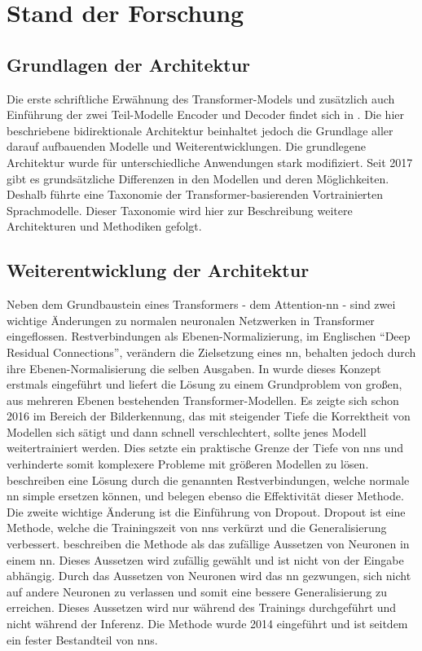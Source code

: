 \chapter{Stand der Forschung}\label{ch:relatedWork}
\section{Grundlagen der Architektur}
Die erste schriftliche Erwähnung des Transformer-Models und zusätzlich auch Einführung der zwei Teil-Modelle Encoder und Decoder findet sich in \citet{attention}.
Die hier beschriebene bidirektionale Architektur beinhaltet jedoch die Grundlage aller darauf aufbauenden Modelle und Weiterentwicklungen. 
Die grundlegene Architektur wurde für unterschiedliche Anwendungen stark modifiziert. 
Seit 2017 gibt es grundsätzliche Differenzen in den Modellen und deren Möglichkeiten. 
Deshalb führte \citet{ammus} eine Taxonomie der Transformer-basierenden Vortrainierten Sprachmodelle. 
Dieser Taxonomie wird hier zur Beschreibung weitere Architekturen und Methodiken gefolgt.\\

\section{Weiterentwicklung der Architektur}
Neben dem Grundbaustein eines Transformers - dem Attention-\ac{nn} - sind zwei wichtige Änderungen zu normalen neuronalen Netzwerken in Transformer eingeflossen. 
Restverbindungen als Ebenen-Normalizierung, im Englischen \enquote{Deep Residual Connections}, verändern die Zielsetzung eines \ac{nn}, behalten jedoch durch ihre Ebenen-Normalisierung die selben Ausgaben. 
In \citet{deep_residual} wurde dieses Konzept erstmals eingeführt und liefert die Lösung zu einem Grundproblem von großen, aus mehreren Ebenen bestehenden Transformer-Modellen. 
Es zeigte sich schon 2016 im Bereich der Bilderkennung, das mit steigender Tiefe die Korrektheit von Modellen sich sätigt und dann schnell verschlechtert, sollte jenes Modell weitertrainiert werden. 
Dies setzte ein praktische Grenze der Tiefe von \ac{nn}s und verhinderte somit komplexere Probleme mit größeren Modellen zu lösen. 
\citet{deep_residual} beschreiben eine Lösung durch die genannten Restverbindungen, welche normale \ac{nn} simple ersetzen können, und belegen ebenso die Effektivität dieser Methode.\\

Die zweite wichtige Änderung ist die Einführung von Dropout. 
Dropout ist eine Methode, welche die Trainingszeit von \ac{nn}s verkürzt und die Generalisierung verbessert. 
\citet{dropout} beschreiben die Methode als das zufällige Aussetzen von Neuronen in einem \ac{nn}. 
Dieses Aussetzen wird zufällig gewählt und ist nicht von der Eingabe abhängig. 
Durch das Aussetzen von Neuronen wird das \ac{nn} gezwungen, sich nicht auf andere Neuronen zu verlassen und somit eine bessere Generalisierung zu erreichen. 
Dieses Aussetzen wird nur während des Trainings durchgeführt und nicht während der Inferenz. 
Die Methode wurde 2014 eingeführt und ist seitdem ein fester Bestandteil von \ac{nn}s.\\

